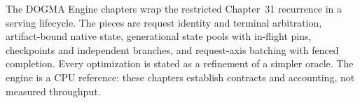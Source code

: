 The DOGMA Engine chapters wrap the restricted Chapter~31 recurrence in a serving lifecycle. The pieces are request identity and terminal arbitration, artifact-bound native state, generational state pools with in-flight pins, checkpoints and independent branches, and request-axis batching with fenced completion. Every optimization is stated as a refinement of a simpler oracle. The engine is a CPU reference: these chapters establish contracts and accounting, not measured throughput.
